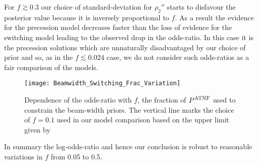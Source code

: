 \documentclass[../full_thesis/full_thesis.tex]{subfiles}
\begin{document}
For $f \gtrsim 0.3$ our choice of standard-deviation for $\rho_2''$ starts to
disfavour the posterior value because it is inversely proportional to $f$. As
a result the evidence for the precession model decreases faster than the loss of
evidence for the switching model leading to the observed drop in the odds-ratio.
In this case it is the precession solutions which are unnaturally disadvantaged
by our choice of prior and so, as in the $f\lesssim 0.024$ case, we do not consider
such odds-ratios as a fair comparison of the models.

\begin{figure}
\centering
\texttt{[image: Beamwidth\_Switching\_Frac\_Variation]}
\caption{Dependence of the
         odds-ratio with $f$, the fraction of $P^{\mathrm{ATNF}}$ used to constrain the
         beam-width priors. The vertical line
         marks the choice of $f=0.1$ used in our model comparison based on the
         upper limit given by \citet{Lyne1988}}
\label{fig: beamwidth switching frac variation}
\end{figure}

In summary the log-odds-ratio and hence our conclusion is robust to reasonable
variations in $f$ from 0.05 to 0.5.
\end{document}
